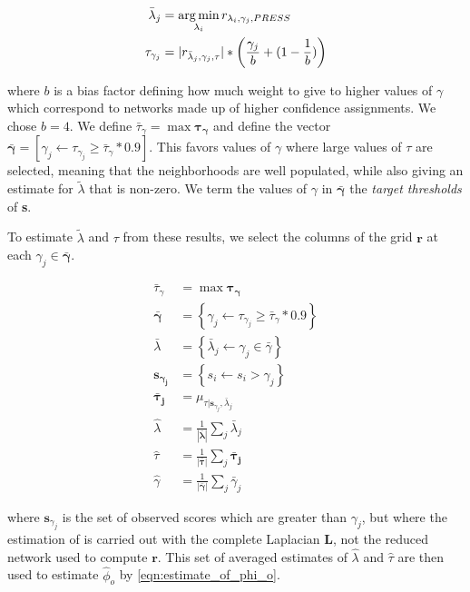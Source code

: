     \begin{align}
        {\bar \lambda_j} &= \operatorname*{arg\,min}_{\lambda_i}{r_{\lambda_i, \gamma_j, PRESS}} \\
        \tau_{\gamma_j} &= |r_{{\bar \lambda_j}, \gamma_j, \tau}| * \left(
            \frac{\gamma_j}{b} + (1 - \frac{1}{b})\right)
    \end{align}

    \noindent where $b$ is a bias factor defining how much
    weight to give to higher values of $\gamma$ which
    correspond to networks made up of higher confidence
    assignments. We chose $b = 4$. We define ${\bar \tau_\gamma} =
    \max{\mathbf{\tau_\gamma}}$ and define the  vector
    $\mathbf{\bar \gamma} = \left[\gamma_j \leftarrow\tau_{\gamma_j}
    \ge {\bar \tau_\gamma} * 0.9\right]$. This favors values of
    $\gamma$ where large values of $\tau$ are selected, meaning that
    the neighborhoods are well populated, while also giving an estimate
    for ${\tilde \lambda}$ that is non-zero. We term the values of
    $\gamma$ in $\mathbf{{\bar \gamma}}$ the {\em target thresholds}
    of \textbf{s}.

        To estimate ${\tilde \lambda}$ and $\tau$ from these results,
    we select the columns of the grid $\mathbf{r}$ at each $\gamma_j
    \in \mathbf{{\bar \gamma}}$.

    \begin{align}
    {\bar \tau_\gamma} &= \max{\mathbf{\tau_\gamma}}\\
    \mathbf{\bar \gamma} &= \left\{\gamma_j \leftarrow\tau_{\gamma_j}
        \ge {\bar \tau_\gamma} * 0.9\right\}\\
    {\bar \lambda} &= \left\{ {\bar \lambda_j} \leftarrow \gamma_j \in {\bar \gamma}\right\}\\
    \mathbf{s_{\gamma_j}} &= \left\{s_i \leftarrow s_i > \gamma_j\right\} \\
    \mathbf{{\bar \tau_j}} &= \mu_{\tau|\mathbf{s}_{\gamma_j}, {\bar \lambda}_j}\\
    {\hat \lambda} &= \frac{1}{|\mathbf{{\bar \lambda}}|}\sum_j {\bar \lambda}_j\\
    {\hat \tau} &= \frac{1}{|\mathbf{{\bar \tau}}|}\sum_j \mathbf{{\bar \tau_j}}\\
    {\hat \gamma} &= \frac{1}{|\mathbf{{\bar \gamma}}|}\sum_j {\bar \gamma}_j
    \end{align}

    \noindent where $\mathbf{s}_{\gamma_j}$ is the set of observed
    scores which are greater than $\gamma_j$, but where the estimation
    of is carried out with the complete Laplacian $\mathbf{L}$,
    not the reduced network used to compute $\mathbf{r}$. This set of
    averaged estimates of ${\hat \lambda}$ and ${\hat \tau}$ are then
    used to estimate ${\hat \phi_o}$ by \eqref{eqn:estimate_of_phi_o}.